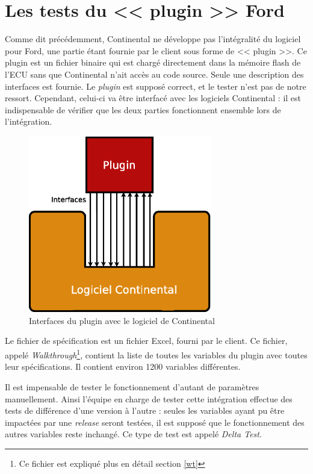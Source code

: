 	\section{Les tests du << plugin >> Ford}\label{plugin}
	Comme dit précédemment, Continental ne développe pas l'intégralité du logiciel pour Ford, une partie étant fournie par le client sous forme de << plugin >>. Ce plugin est un fichier binaire qui est chargé directement dans la mémoire flash de l'ECU sans que Continental n'ait accès au code source. Seule une description des interfaces est fournie. Le \textit{plugin} est supposé correct, et le tester n'est pas de notre ressort. Cependant, celui-ci va être interfacé avec les logiciels Continental : il est indispensable de vérifier que les deux parties fonctionnent ensemble lors de l'intégration.
	\begin{figure}[H]
		\centering
		\includegraphics[width=8.0cm]{contents/images/plugin.eps}
		\caption{Interfaces du plugin avec le logiciel de Continental}
		\label{fig:plugin}	
	\end{figure}
	
	Le fichier de spécification est un fichier Excel, fourni par le client. Ce fichier, appelé \textit{Walkthrough}\footnote{Ce fichier est expliqué plus en détail section \ref{wt}}, 
	contient la liste de toutes les variables du plugin avec toutes leur spécifications. Il contient
	environ 1200 variables différentes. 
	
	Il est impensable de tester le fonctionnement d'autant de paramètres manuellement. Ainsi l'équipe en
	charge de tester cette intégration effectue des tests de différence d'une version à l'autre : seules les variables ayant pu être impactées par une \textit{release} seront testées, il est supposé que le fonctionnement des autres variables reste inchangé. Ce type de test est appelé \textit{Delta Test}.
	
